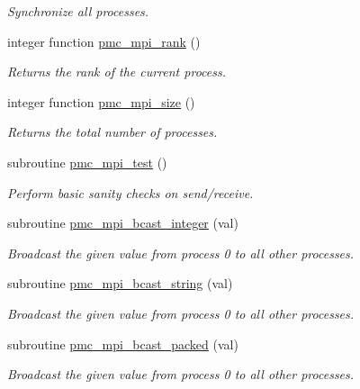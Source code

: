 \begin{DoxyCompactItemize}
\begin{DoxyCompactList}\small\item\em Synchronize all processes. \end{DoxyCompactList}\item 
integer function \mbox{\hyperlink{namespacepmc__mpi_a1ac93b34387cb8dec130a10c4f959e9b}{pmc\+\_\+mpi\+\_\+rank}} ()
\begin{DoxyCompactList}\small\item\em Returns the rank of the current process. \end{DoxyCompactList}\item 
integer function \mbox{\hyperlink{namespacepmc__mpi_abc7ec25375502391c6ab03a7459b5cd0}{pmc\+\_\+mpi\+\_\+size}} ()
\begin{DoxyCompactList}\small\item\em Returns the total number of processes. \end{DoxyCompactList}\item 
subroutine \mbox{\hyperlink{namespacepmc__mpi_a92cc3237c6fa0152c4da6571ba5fdef9}{pmc\+\_\+mpi\+\_\+test}} ()
\begin{DoxyCompactList}\small\item\em Perform basic sanity checks on send/receive. \end{DoxyCompactList}\item 
subroutine \mbox{\hyperlink{namespacepmc__mpi_a8c5c43ef03395c028808ccc21c6afb1b}{pmc\+\_\+mpi\+\_\+bcast\+\_\+integer}} (val)
\begin{DoxyCompactList}\small\item\em Broadcast the given value from process 0 to all other processes. \end{DoxyCompactList}\item 
subroutine \mbox{\hyperlink{namespacepmc__mpi_a4cd3eb742c928a5f4f796dd8d76263cc}{pmc\+\_\+mpi\+\_\+bcast\+\_\+string}} (val)
\begin{DoxyCompactList}\small\item\em Broadcast the given value from process 0 to all other processes. \end{DoxyCompactList}\item 
subroutine \mbox{\hyperlink{namespacepmc__mpi_aa53168e6f5f0abea92823b4254e57f70}{pmc\+\_\+mpi\+\_\+bcast\+\_\+packed}} (val)
\begin{DoxyCompactList}\small\item\em Broadcast the given value from process 0 to all other processes. \end{DoxyCompactList}\item 

\end{DoxyCompactItemize}
